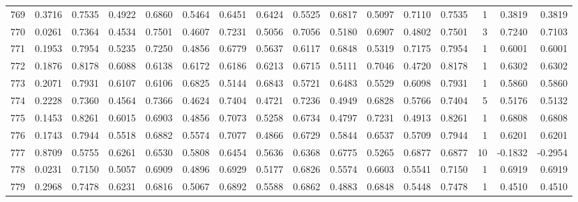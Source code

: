 \begin{tabular}{lrrrrrrrrrrrrrrr}
769 &      0.3716 &  0.7535 &  0.4922 &  0.6860 &  0.5464 &  0.6451 &  0.6424 &  0.5525 &  0.6817 &  0.5097 &   0.7110 &     0.7535 &      1 &                    0.3819 &                     0.3819 \\
770 &      0.0261 &  0.7364 &  0.4534 &  0.7501 &  0.4607 &  0.7231 &  0.5056 &  0.7056 &  0.5180 &  0.6907 &   0.4802 &     0.7501 &      3 &                    0.7240 &                     0.7103 \\
771 &      0.1953 &  0.7954 &  0.5235 &  0.7250 &  0.4856 &  0.6779 &  0.5637 &  0.6117 &  0.6848 &  0.5319 &   0.7175 &     0.7954 &      1 &                    0.6001 &                     0.6001 \\
772 &      0.1876 &  0.8178 &  0.6088 &  0.6138 &  0.6172 &  0.6186 &  0.6213 &  0.6715 &  0.5111 &  0.7046 &   0.4720 &     0.8178 &      1 &                    0.6302 &                     0.6302 \\
773 &      0.2071 &  0.7931 &  0.6107 &  0.6106 &  0.6825 &  0.5144 &  0.6843 &  0.5721 &  0.6483 &  0.5529 &   0.6098 &     0.7931 &      1 &                    0.5860 &                     0.5860 \\
774 &      0.2228 &  0.7360 &  0.4564 &  0.7366 &  0.4624 &  0.7404 &  0.4721 &  0.7236 &  0.4949 &  0.6828 &   0.5766 &     0.7404 &      5 &                    0.5176 &                     0.5132 \\
775 &      0.1453 &  0.8261 &  0.6015 &  0.6903 &  0.4856 &  0.7073 &  0.5258 &  0.6734 &  0.4797 &  0.7231 &   0.4913 &     0.8261 &      1 &                    0.6808 &                     0.6808 \\
776 &      0.1743 &  0.7944 &  0.5518 &  0.6882 &  0.5574 &  0.7077 &  0.4866 &  0.6729 &  0.5844 &  0.6537 &   0.5709 &     0.7944 &      1 &                    0.6201 &                     0.6201 \\
777 &      0.8709 &  0.5755 &  0.6261 &  0.6530 &  0.5808 &  0.6454 &  0.5636 &  0.6368 &  0.6775 &  0.5265 &   0.6877 &     0.6877 &     10 &                   -0.1832 &                    -0.2954 \\
778 &      0.0231 &  0.7150 &  0.5057 &  0.6909 &  0.4896 &  0.6929 &  0.5177 &  0.6826 &  0.5574 &  0.6603 &   0.5541 &     0.7150 &      1 &                    0.6919 &                     0.6919 \\
779 &      0.2968 &  0.7478 &  0.6231 &  0.6816 &  0.5067 &  0.6892 &  0.5588 &  0.6862 &  0.4883 &  0.6848 &   0.5448 &     0.7478 &      1 &                    0.4510 &                     0.4510 \\

\end{tabular}
